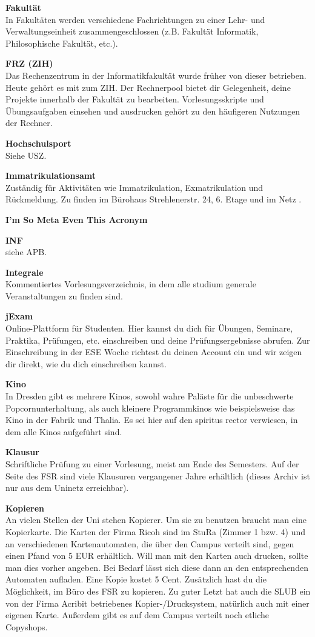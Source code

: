 \textbf{Fakultät} \\
In Fakultäten werden verschiedene Fachrichtungen zu einer Lehr- und Verwaltungseinheit zusammengeschlossen (z.B. Fakultät Informatik, Philosophische Fakultät, etc.).

\textbf{FRZ (ZIH)} \\
Das Rechenzentrum in der Informatikfakultät wurde früher von dieser betrieben.
Heute gehört es mit zum ZIH.
Der Rechnerpool bietet dir Gelegenheit, deine Projekte innerhalb der Fakultät zu bearbeiten.
Vorlesungsskripte und Übungsaufgaben einsehen und ausdrucken gehört zu den häufigeren Nutzungen der Rechner.

\textbf{Hochschulsport} \\
Siehe USZ.

\textbf{Immatrikulationsamt} \\
Zuständig für Aktivitäten wie Immatrikulation, Exmatrikulation und Rückmeldung.
Zu finden im Bürohaus Strehlenerstr. 24, 6. Etage und im Netz .

\textbf{I'm So Meta Even This Acronym}

\textbf{INF} \\
siehe APB.

\textbf{Integrale} \\
Kommentiertes Vorlesungsverzeichnis, in dem alle studium generale Veranstaltungen zu finden sind.

\textbf{jExam} \\
Online-Plattform für Studenten.
Hier kannst du dich für Übungen, Seminare, Praktika, Prüfungen, etc. einschreiben und deine Prüfungsergebnisse abrufen.
Zur Einschreibung in der ESE Woche richtest du deinen Account ein und wir zeigen dir direkt, wie du dich einschreiben kannst.

\textbf{Kino} \\
In Dresden gibt es mehrere Kinos, sowohl wahre Paläste für die unbeschwerte Popcornunterhaltung, als auch kleinere Programmkinos wie beispielsweise das Kino in der Fabrik und Thalia.
Es sei hier auf den spiritus rector verwiesen, in dem alle Kinos aufgeführt sind.

\textbf{Klausur} \\
Schriftliche Prüfung zu einer Vorlesung, meist am Ende des Semesters.
Auf der Seite des FSR sind viele Klausuren vergangener Jahre erhältlich (dieses Archiv ist nur aus dem Uninetz erreichbar).

\textbf{Kopieren} \\
An vielen Stellen der Uni stehen Kopierer.
Um sie zu benutzen braucht man eine Kopierkarte.
Die Karten der Firma Ricoh sind im StuRa (Zimmer 1 bzw. 4) und an verschiedenen Kartenautomaten, die über den Campus verteilt sind, gegen einen Pfand von 5 EUR erhältlich.
Will man mit den Karten auch drucken, sollte man dies vorher angeben.
Bei Bedarf lässt sich diese dann an den entsprechenden Automaten aufladen.
Eine Kopie kostet 5 Cent.
Zusätzlich hast du die Möglichkeit, im Büro des FSR zu kopieren.
Zu guter Letzt hat auch die SLUB ein von der Firma Acribit betriebenes Kopier-/Drucksystem, natürlich auch mit einer eigenen Karte.
Außerdem gibt es auf dem Campus verteilt noch etliche Copyshops.

